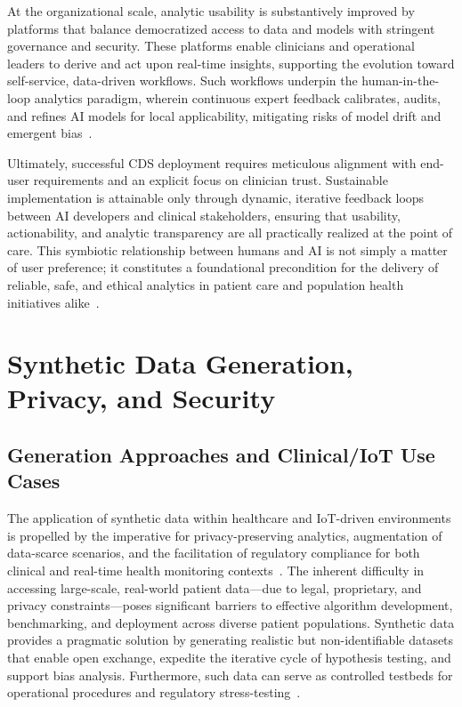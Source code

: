 At the organizational scale, analytic usability is substantively improved by platforms that balance democratized access to data and models with stringent governance and security. These platforms enable clinicians and operational leaders to derive and act upon real-time insights, supporting the evolution toward self-service, data-driven workflows. Such workflows underpin the human-in-the-loop analytics paradigm, wherein continuous expert feedback calibrates, audits, and refines AI models for local applicability, mitigating risks of model drift and emergent bias~\cite{ref84,ref106}.

Ultimately, successful CDS deployment requires meticulous alignment with end-user requirements and an explicit focus on clinician trust. Sustainable implementation is attainable only through dynamic, iterative feedback loops between AI developers and clinical stakeholders, ensuring that usability, actionability, and analytic transparency are all practically realized at the point of care. This symbiotic relationship between humans and AI is not simply a matter of user preference; it constitutes a foundational precondition for the delivery of reliable, safe, and ethical analytics in patient care and population health initiatives alike~\cite{ref87,ref99,ref106}.

\section{Synthetic Data Generation, Privacy, and Security}

\subsection{Generation Approaches and Clinical/IoT Use Cases}

The application of synthetic data within healthcare and IoT-driven environments is propelled by the imperative for privacy-preserving analytics, augmentation of data-scarce scenarios, and the facilitation of regulatory compliance for both clinical and real-time health monitoring contexts~\cite{ref91,ref106}. The inherent difficulty in accessing large-scale, real-world patient data—due to legal, proprietary, and privacy constraints—poses significant barriers to effective algorithm development, benchmarking, and deployment across diverse patient populations. Synthetic data provides a pragmatic solution by generating realistic but non-identifiable datasets that enable open exchange, expedite the iterative cycle of hypothesis testing, and support bias analysis. Furthermore, such data can serve as controlled testbeds for operational procedures and regulatory stress-testing~\cite{ref91,ref106}.

